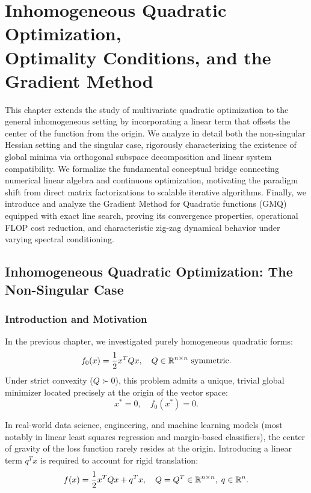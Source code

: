 \chapter[Inhomogeneous Quadratic Optimization and GMQ]{Inhomogeneous Quadratic Optimization,\\Optimality Conditions, and the Gradient Method}
\label{chap:inhomogeneous-quadratic-optimization-gmq}

This chapter extends the study of multivariate quadratic optimization to the general inhomogeneous setting by incorporating a linear term that offsets the center of the function from the origin. We analyze in detail both the non-singular Hessian setting and the singular case, rigorously characterizing the existence of global minima via orthogonal subspace decomposition and linear system compatibility. We formalize the fundamental conceptual bridge connecting numerical linear algebra and continuous optimization, motivating the paradigm shift from direct matrix factorizations to scalable iterative algorithms. Finally, we introduce and analyze the Gradient Method for Quadratic functions (GMQ) equipped with exact line search, proving its convergence properties, operational FLOP cost reduction, and characteristic zig-zag dynamical behavior under varying spectral conditioning.

\FloatBarrier
\section{Inhomogeneous Quadratic Optimization: The Non-Singular Case}
\label{sec:inhomogeneous-quadratic-non-singular}

\subsection{Introduction and Motivation}
In the previous chapter, we investigated purely homogeneous quadratic forms:
\begin{equation}
    f_0(x) = \frac{1}{2} x^T Q x, \quad Q \in \mathbb{R}^{n \times n} \text{ symmetric}.
\end{equation}
Under strict convexity ($Q \succ 0$), this problem admits a unique, trivial global minimizer located precisely at the origin of the vector space:
\begin{equation}
    x^* = 0, \quad f_0(x^*) = 0.
\end{equation}

In real-world data science, engineering, and machine learning models (most notably in linear least squares regression and margin-based classifiers), the center of gravity of the loss function rarely resides at the origin. Introducing a linear term $q^T x$ is required to account for rigid translation:
\begin{equation}
    f(x) = \frac{1}{2} x^T Q x + q^T x, \quad Q = Q^T \in \mathbb{R}^{n \times n}, \; q \in \mathbb{R}^n.
    \label{eq:inhomogeneous-quadratic}
\end{equation}

